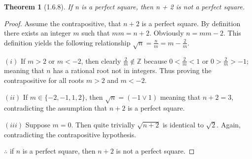 \documentclass[a4paper, 12pt]{article}
\theoremstyle{plain}
\newtheorem*{theorem*}{Theorem}
\begin{document}
	
	\begin{theorem*}[1.6.8]
		If n is a perfect square, then n + 2 is not a perfect square.
	\end{theorem*}
	
	\begin{proof}
		Assume the contrapositive, that $n + 2$ is a perfect square. By definition there exists an integer $m$ such that $mm = n + 2$. Obviously $n = mm - 2$. This definition yields the following relationship $\sqrt{n} = \frac{n}{m} = m - \frac{2}{m}$.
		
		\noindent \newline $(i)$ If $m > 2$ or $m < -2$, then clearly $\frac{2}{m} \notin \mathbb{Z}$ because $0 < \frac{2}{m} < 1$ or $0 > \frac{2}{m} > -1$; meaning that $n$ has a rational root not in integers. Thus proving the contrapositive for all roots $m > 2$ and $m < -2$.
		
		\noindent \newline $(ii)$ If $m \in \{-2, -1, 1, 2\}$, then $\sqrt{n} = (-1 \lor 1)$ meaning that $n + 2 = 3$,  contradicting the assumption that $n + 2$ is a perfect square. 
		
		\noindent \newline $(iii)$ Suppose $m = 0$. Then quite trivially $\sqrt{n + 2}$ is identical to $\sqrt{2}$. Again, contradicting the contrapositive hypothesis. 
		
		\noindent \newline $\therefore$ \space if $n$ is a perfect square, then $n + 2$ is not a perfect square.
	\end{proof}
\end{document}
